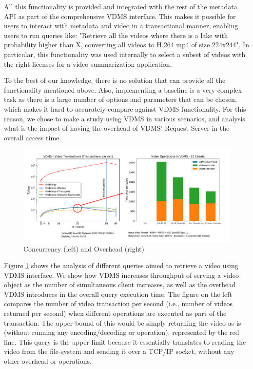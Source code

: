 All this functionality is provided and integrated with the rest of the
metadata API as part of the comprehensive VDMS interface. This makes it
possible for users to interact with metadata and video in a transactional
manner, enabling users to run queries like: "Retrieve all the videos
where there is a lake with probability higher than X, converting all videos
to H.264 mp4 of size 224x244".
In particular, this functionality was used internally to select a subset
of videos with the right licenses for a video summarization application.

To the best of our knowledge, there is no solution that can provide
all the functionality mentioned above. Also, implementing a baseline is a very
complex task as there is a large number of options and parameters that can
be chosen, which makes it hard to accurately compare against VDMS functionality.
For this reason, we chose to make a study using VDMS in various scenarios,
and analysis what is the impact of having the overhead of VDMS' Request
Server in the overall access time.

\begin{figure}[ht!]
\centering
\includegraphics[width=\textwidth]{figures/video_overhead}
\caption{Concurrency (left) and Overhead (right)}
\label{fig:video}
\end{figure}

Figure \ref{fig:video} shows the analysis of different queries aimed to retrieve
a video using VDMS interface. We show how VDMS increases throughput of serving
a video object as the number of simultaneous client increases, as well as the
overhead VDMS introduces in the overall query execution time.
The figure on the left compares the number of video transaction per second
(i.e., number of videos returned per second) when different operations
are executed as part of the transaction. The upper-bound of this would be
simply returning the video as-is (without running any encoding/decoding or
operation), represented by the red line. This query is the upper-limit because
it essentially translates to reading the video from the file-system and sending
it over a TCP/IP socket, without any other overhead or operations.

